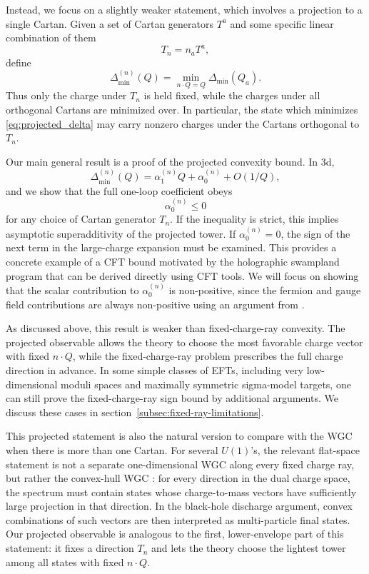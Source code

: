 \documentclass[a4paper,11pt]{article}
\begin{document}
Instead, we focus on a slightly weaker statement, which involves a projection to a single Cartan. Given a set of Cartan generators $T^a$ and some specific linear combination of them
\begin{equation}
  T_n=n_aT^a,
\end{equation}
define
\begin{equation}\label{eq:projected_delta}
  \Delta_{\min}^{(n)}(Q)= \min_{n\cdot Q=Q}\Delta_{\min}(Q_a).
\end{equation}
Thus only the charge under $T_n$ is held fixed, while the charges under all orthogonal Cartans are minimized over. In particular, the state which minimizes \eqref{eq:projected_delta} may carry nonzero charges under the Cartans orthogonal to $T_n$.

Our main general result is a proof of the projected convexity bound. In 3d,
\begin{equation}
  \Delta_{\min}^{(n)}(Q) = \alpha_1^{(n)}Q+\alpha_0^{(n)}+O(1/Q),
\end{equation}
and we show that the full one-loop coefficient obeys 
\begin{equation}\label{eq:intro_bound}
  \alpha_0^{(n)}\leq 0
\end{equation} 
for any choice of Cartan generator $T_n$. If the inequality is strict, this implies asymptotic superadditivity of the projected tower. If $\alpha_0^{(n)}=0$, the sign of the next term in the large-charge expansion must be examined. This provides a concrete example of a CFT bound motivated by the holographic swampland program that can be derived directly using CFT tools. We will focus on showing that the scalar contribution to $\alpha_0^{(n)}$ is non-positive, since the fermion and gauge field contributions are always non-positive using an argument from \cite{Cuomo:2024fuy}.


As discussed above, this result is weaker than fixed-charge-ray convexity. The projected observable allows the theory to choose the most favorable charge vector with fixed $n\cdot Q$, while the fixed-charge-ray problem prescribes the full charge direction in advance. In some simple classes of EFTs, including very low-dimensional moduli spaces and maximally symmetric sigma-model targets, one can still prove the fixed-charge-ray sign bound by additional arguments. We discuss these cases in section~\ref{subsec:fixed-ray-limitations}. 

This projected statement is also the natural version to compare with the WGC when there is more than one Cartan. For several $U(1)$'s, the relevant flat-space statement is not a separate one-dimensional WGC along every fixed charge ray, but rather the convex-hull WGC \cite{Cheung:2014vva}: for every direction in the dual charge space, the spectrum must contain states whose charge-to-mass vectors have sufficiently large projection in that direction. In the black-hole discharge argument, convex combinations of such vectors are then interpreted as multi-particle final states. Our projected observable is analogous to the first, lower-envelope part of this statement: it fixes a direction $T_n$ and lets the theory choose the lightest tower among all states with fixed $n\cdot Q$.
\end{document}
